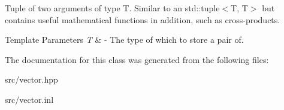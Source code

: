 Tuple of two arguments of type T. Similar to an std\+::tuple$<$\+T, T$>$ but contains useful mathematical functions in addition, such as cross-\/products. 
\begin{DoxyTemplParams}{Template Parameters}
{\em T} & -\/ The type of which to store a pair of. \\
\hline
\end{DoxyTemplParams}


The documentation for this class was generated from the following files\+:\begin{DoxyCompactItemize}
\item 
src/vector.\+hpp\item 
src/vector.\+inl\end{DoxyCompactItemize}
